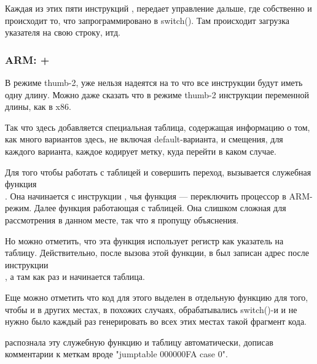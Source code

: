 Каждая из этих пяти инструкций , передает управление дальше, где собственно и происходит то, 
что запрограммировано в switch(). Там происходит загрузка указателя на свою строку, итд.

\subsubsection{ARM: \OptimizingKeil + \ThumbMode}



В режиме thumb-2, уже нельзя надеятся на то что все инструкции будут иметь одну длину. 
Можно даже сказать что в режиме thumb-2 инструкции переменной длины, как в x86.

Так что здесь добавляется специальная таблица, содержащая информацию о том, как много вариантов здесь,
не включая default-варианта, и смещения, для каждого варианта, каждое кодирует метку, куда перейти в 
каком случае.

Для того чтобы работать с таблицей и совершить переход, вызывается служебная функция \\
. Она начинается с инструкции , чья функция --- 
переключить процессор в ARM-режим. Далее функция работающая с таблицей. Она слишком сложная для 
рассмотрения в данном месте, так что я пропущу объяснения.

Но можно отметить, что эта функция использует
регистр \LR как указатель на таблицу. Действительно, после вызова этой функции, в \LR был записан
адрес после инструкции \\ 
, а там как раз и начинается таблица.

Еще можно отметить что код для этого выделен в отдельную функцию для того, чтобы и в других местах,
в похожих случаях, обрабатывались switch()-и и не нужно было каждый раз генерировать во всех этих
местах такой фрагмент кода.

\IDA распознала эту служебную функцию и таблицу автоматически, 
дописав комментарии к меткам вроде "jumptable 000000FA case 0".
